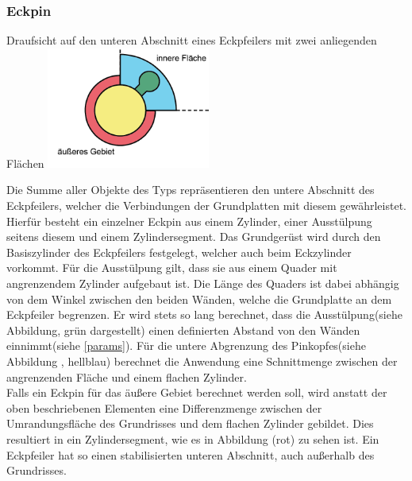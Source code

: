 \subsubsection{Eckpin}
\begin{Bild}{Draufsicht auf den unteren Abschnitt eines Eckpfeilers mit zwei anliegenden Flächen}
	\includegraphics[height=150px]{Bilder/CornerPin2D-07.png}
\end{Bild}
Die Summe aller Objekte des Typs  repräsentieren den untere Abschnitt des Eckpfeilers, welcher die Verbindungen der Grundplatten mit diesem gewährleistet.
Hierfür besteht ein einzelner Eckpin aus einem Zylinder, einer Ausstülpung seitens diesem und einem Zylindersegment.
Das Grundgerüst wird durch den Basiszylinder des Eckpfeilers festgelegt, welcher auch beim Eckzylinder vorkommt.
Für die Ausstülpung gilt, dass sie aus einem Quader mit angrenzendem Zylinder aufgebaut ist.
Die Länge des Quaders ist dabei abhängig von dem Winkel zwischen den beiden Wänden, welche die Grundplatte an dem Eckpfeiler begrenzen.
Er wird stets so lang berechnet, dass die Ausstülpung(siehe Abbildung, grün dargestellt) einen definierten Abstand von den Wänden einnimmt(siehe \ref{params}).
Für die untere Abgrenzung des Pinkopfes(siehe Abbildung \thebildnr, hellblau) berechnet die Anwendung eine Schnittmenge zwischen der angrenzenden Fläche und einem flachen Zylinder.\\
Falls ein Eckpin für das äußere Gebiet berechnet werden soll, wird anstatt der oben beschriebenen Elementen eine Differenzmenge zwischen der Umrandungsfläche des Grundrisses und dem flachen Zylinder gebildet.
Dies resultiert in ein Zylindersegment, wie es in Abbildung \thebildnr (rot) zu sehen ist.
Ein Eckpfeiler hat so einen stabilisierten unteren Abschnitt, auch außerhalb des Grundrisses.


